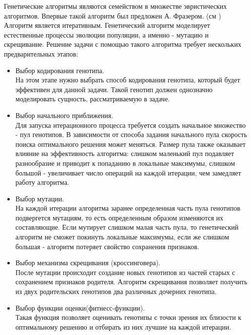 Генетические алгоритмы являются семейством в множестве эвристических алгоритмов. Впервые такой алгоритм был предложен А. Фразером. (см \cite{Фразер1970})
Алгоритм является итеративным.
Генетический алгоритм моделирует естественные процессы эволюции популяции, а именно - мутацию и скрещивание.
Решение задачи с помощью такого алгоритма требует нескольких предварительных этапов:
\begin{itemize}
	\item Выбор кодирования генотипа.\\
На этом этапе нужно выбрать способ кодирования генотипа, который будет эффективен для данной задачи. Такой генотип должен однозначно моделировать сущность, рассматриваемую в задаче.
	\item Выбор начального приближения.\\
Для запуска итерационного процесса требуется создать начальное множество - пул генотипов. В зависимости от способа задания начального пула скорость поиска оптимального решения может меняться. Размер пула также оказывает влияние на эффективность алгоритма: слишком маленький пул подавляет разнообразие и приводит к попаданию в локальные максимумы, слишком большой - увеличивает число операций на каждой итерации, чем замедляет работу алгоритма.
	\item Выбор мутации.\\
На каждой итерации алгоритма заранее определенная часть пула генотипов подвергется мутациям, то есть определенным образом изменяются их составляющие. Если мутирует слишком малая часть пула, то генетический алгоритм не сможет покинуть локальные максимумы, если же слишком большая - алгоритм потеряет свойство сохранения признаков.
	\item Выбор механизма скрещивания (кроссинговера).\\
После мутации происходит создание новых генотипов из частей старых с сохранением признаков родителя. Алгоритм скрещивания позволяет получить из двух родительских генотипов два различных дочерних генотипа.
	\item Выбор функции оценки(фитнесс-функции).\\
Такая функция позволяет оценивать генотипы с точки зрения их близости к оптимальному решению и отбирать из них лучшие на каждой итерации.
\end{itemize}

